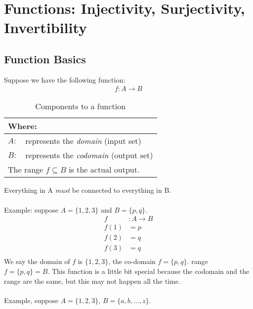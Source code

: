 \chapter{Functions: Injectivity, Surjectivity, Invertibility}
\label{sec:Functions}

\section{Function Basics}
\label{sec:FunctionBasics}
Suppose we have the following function:
\begin{align}
  f:A \to B
  \label{eq:FunctionForm}
\end{align}
\begin{table}[!hbt]
\label{tab:ComponentsToAFunction}
\begin{tabularx}{\linewidth}{| l X |}
  \hline
  \multicolumn{2}{|l|}{Where:} \\
  \hline \hline
  $A:$ & represents the \emph{domain} (input set) \\
  $B:$ & represents the \emph{codomain} (output set) \\
  \multicolumn{2}{|l|}{The range $f \subseteq B$ is the actual output.} \\
  \hline
\end{tabularx}
\caption{Components to a function}
\end{table}
Everything in A \emph{must} be connected to everything in B. \\
\\
Example: suppose $A = \{1, 2, 3\}$ and $B = \{p,q\}$. \\
\begin{align}
     f & : A \to B \nonumber \\
  f(1) & = p \nonumber \\
  f(2) & = q \nonumber \\
  f(3) & = q \nonumber \\
\end{align}
We say the domain of $f$ is $\{1, 2, 3\}$, the co-domain $f=\{p,q\}$. range $f=\{p,q\}=B$.
This function is a little bit special because the codomain and the range are the same, but
this may not happen all the time.\\
\\
Example, suppose $A = \{1, 2, 3\}$, $B = \{a, b, \ldots, z\}$. \\
